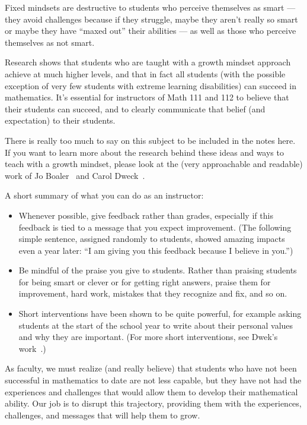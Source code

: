 \documentclass[12pt, reqno]{amsart}
\theoremstyle{remark}
\theoremstyle{definition}
\numberwithin{equation}{section}  %
\begin{document}
Fixed mindsets are destructive to students who perceive themselves as smart --- they avoid challenges because if they struggle, maybe they aren't really so smart or maybe they have ``maxed out'' their abilities --- as well as those who perceive themselves as not smart.  

Research shows that students who are taught with a growth mindset approach achieve at much higher levels, and that in fact all students (with the possible exception of very few students with extreme learning disabilities) can succeed in mathematics.  It's essential for instructors of Math 111 and 112 to believe that their students can succeed, and to clearly communicate that belief (and expectation) to their students.  

There is really too much to say on this subject to be included in the notes here.  If you want to learn more about the research behind these ideas and ways to teach with a growth mindset, please look at the (very approachable and readable) work of Jo Boaler~\cite{boaler} and Carol Dweck~\cite{dweck}.  


A short summary of what you can do as an instructor:

\begin{itemize}
\item 
Whenever possible, give feedback rather than grades, especially if this feedback is tied to a message that you expect improvement.  (The following simple sentence, assigned randomly to students, showed amazing impacts even a year later: ``I am giving you this feedback because I believe in you.'')

\item 
Be mindful of the praise you give to students.  Rather than praising students for being smart or clever or for getting right answers, praise them for improvement, hard work, mistakes that they recognize and fix, and so on.

\item
Short interventions have been shown to be quite powerful, for example asking students at the start of the school year to write about their personal values and why they are important.  (For more short interventions, see Dwek's work~\cite{dweck}.)
\end{itemize}

As faculty, we must realize (and really believe) that students who have not been successful in mathematics to date are not less capable, but they have not had the experiences and challenges that would allow them to develop their mathematical ability.  Our job is to disrupt this trajectory, providing them with the experiences, challenges, and messages that will help them to grow.
\end{document}
